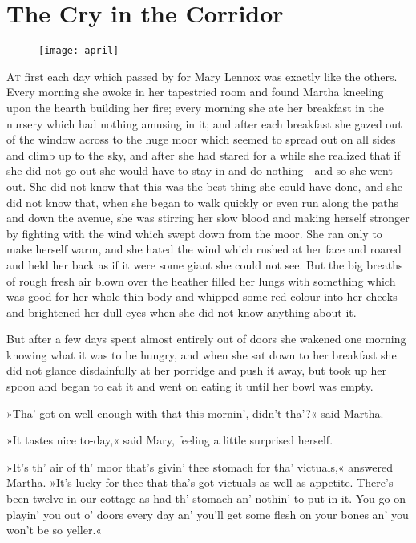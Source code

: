 \chapter{The Cry in the Corridor} 
	
\begin{figure}[t!]
\centering
\texttt{[image: april]}
\end{figure}

 \lettrine[lines=6]{A}{t} first each day which passed by for Mary Lennox was exactly like the others. Every morning she awoke in her tapestried room and found Martha kneeling upon the hearth building her fire; every morning she ate her breakfast in the nursery which had nothing amusing in it; and after each breakfast she gazed out of the window across to the huge moor which seemed to spread out on all sides and climb up to the sky, and after she had stared for a while she realized that if she did not go out she would have to stay in and do nothing—and so she went out. She did not know that this was the best thing she could have done, and she did not know that, when she began to walk quickly or even run along the paths and down the avenue, she was stirring her slow blood and making herself stronger by fighting with the wind which swept down from the moor. She ran only to make herself warm, and she hated the wind which rushed at her face and roared and held her back as if it were some giant she could not see. But the big breaths of rough fresh air blown over the heather filled her lungs with something which was good for her whole thin body and whipped some red colour into her cheeks and brightened her dull eyes when she did not know anything about it.

But after a few days spent almost entirely out of doors she wakened one morning knowing what it was to be hungry, and when she sat down to her breakfast she did not glance disdainfully at her porridge and push it away, but took up her spoon and began to eat it and went on eating it until her bowl was empty.

»Tha' got on well enough with that this mornin', didn't tha'?« said Martha.

»It tastes nice to-day,« said Mary, feeling a little surprised herself.

»It's th' air of th' moor that's givin' thee stomach for tha' victuals,« answered Martha. »It's lucky for thee that tha's got victuals as well as appetite. There's been twelve in our cottage as had th' stomach an' nothin' to put in it. You go on playin' you out o' doors every day an' you'll get some flesh on your bones an' you won't be so yeller.«

